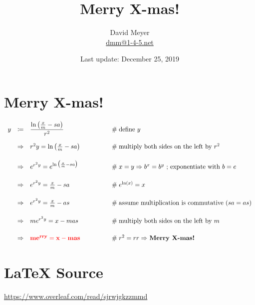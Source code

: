\documentclass[11pt, oneside]{article}
\title{Merry X-mas!}
\author{David Meyer \\ \href{mailto:dmm@1-4-5.net}{dmm@1-4-5.net}}
\date{Last update: December 25, 2019}
\begin{document}
\maketitle

\section{Merry X-mas!}

\bigskip
\Large {
  \begin{equation*}
   \begin{array}{rcll} 
		y
		&\coloneqq& {\displaystyle \frac{\ln \big (\frac{x}{m} -  sa  \big ) }{r^2}}                                            
				&\qquad \qquad \mathrel{\#} \text{define $y$} \\
[15pt]
		&\Rightarrow& r^2 y = \ln \big (\frac{x}{m} -  sa  \big )    
				&\qquad \qquad  \mathrel{\#} \text{multiply both sides on the left by $r^2$} \\
[15pt]
		&\Rightarrow& e^{r^2y} = e^{\ln \big ( \frac{x}{m} -  sa\big )}                           
				&\qquad \qquad \mathrel{\#} \text{$x = y \Rightarrow b^x =b^y$ ; exponentiate with $b = e$} \\
[15pt]
		&\Rightarrow& e^{r^2y} = \frac{x}{m} -  sa                           
				&\qquad \qquad \mathrel{\#} e^{\ln(x)} = x \\
[15pt]
		&\Rightarrow& e^{r^2y} = \frac{x}{m} -  as						
				&\qquad \qquad \mathrel{\#} \text{assume multiplication is commutative $(sa = as)$} \\ 
[15pt]
		&\Rightarrow& m e^{r^2y} = x - mas                                        
				&\qquad \qquad \mathrel{\#} \text{multiply both sides on the left by $m$} \\
[15pt]
		&\Rightarrow& \bf{\color{red}{m e^{rry} = x - mas}}                                     
				&\qquad \qquad \mathrel{\#} \text{$r^2 = rr \Rightarrow$ \bf{Merry X-mas!}}
    \end{array}
   \end{equation*}
}

%
%
\section{\LaTeX \hspace{0.1mm} Source}
\url{https://www.overleaf.com/read/sjrwjgkzzmmd}
\end{document}
